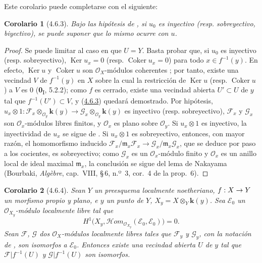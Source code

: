 \documentclass[10pt,oneside,openany]{book}
\theoremstyle{egaenv}\newtheorem*{env}{---}
\theoremstyle{egastatement}
\newtheorem*{corollary}{Corolario}
\theoremstyle{egadescription}
\newcommand{\oldpage}[2][]{\marginnote{\normalfont\scriptsize\textbf{#1}\,|\,#2}\ignorespaces}
\renewcommand{\to}{\mathchoice{\longrightarrow}{\rightarrow}{\rightarrow}{\rightarrow}}
\begin{document}
Este corolario puede completarse con el siguiente:

\begin{corollary}[4.6.3]
\label{III.4.6.3}
\label{III.4.6.3-fr}
Bajo las hipótesis de , si $u_0$ es inyectivo \textup{(resp.} sobreyectivo, biyectivo), se puede suponer que lo mismo ocurre con $u$.
\end{corollary}

\begin{proof}
Se puede limitar al caso en que $U=Y$. Basta probar
que, si $u_0$ es
inyectivo (resp. sobreyectivo), $\operatorname{Ker}u_x=0$ (resp.
$\operatorname{Coker}u_x=0$) para todo $x\in f^{-1}(y)$. En efecto, $\operatorname{Ker}u$ y $\operatorname{Coker}u$ son
$\mathcal O_X$-módulos coherentes ; por tanto, existe una
vecindad $V$ de $f^{-1}(y)$ en $X$ sobre la cual la restricción de
$\operatorname{Ker}u$ (resp. $\operatorname{Coker}u$) a $V$ es $0$
(\textbf{0}\textsubscript{I}, 5.2.2); como $f$ es cerrado, existe una vecindad abierta
$U'\subset U$ de $y$ tal que $f^{-1}(U')\subset V$, y
(\hyperref[III.4.6.3-fr]{4.6.3}) quedará demostrado. Por hipótesis,
$u_x\otimes1:
\mathcal F_x\otimes_{\mathcal O_y}\boldsymbol{k}(y)
\longrightarrow
\mathcal G_x\otimes_{\mathcal O_y}\boldsymbol{k}(y)$
es inyectivo (resp. sobreyectivo),
\oldpage[III]{142}
$\mathcal F_x$ y $\mathcal G_x$
son $\mathcal O_x$-módulos libres finitos, y $\mathcal O_x$ es plano sobre
$\mathcal O_y$. Si $u_x\otimes1$ es inyectivo, la inyectividad de $u_x$
se sigue de . Si $u_x\otimes1$ es sobreyectivo,
entonces, con mayor razón, el homomorfismo inducido
$\mathcal F_x/\mathfrak m_x\mathcal F_x
\longrightarrow
\mathcal G_x/\mathfrak m_x\mathcal G_x$, que se deduce por paso a los cocientes, es sobreyectivo; como $\mathcal G_x$ es un $\mathcal O_x$-módulo finito y
$\mathcal O_x$ es un anillo local de ideal maximal $\mathfrak m_x$, la
conclusión se sigue del lema de Nakayama (Bourbaki,
\emph{Alg\`ebre}, cap.~VIII, \S\,6, n.º~3, cor.~4 de la prop.~6).
\end{proof}

\begin{corollary}[4.6.4]
\label{III.4.6.4}
\label{III.4.6.4-fr}
Sean $Y$ un preesquema localmente noetheriano, $f:X\to Y$ un
morfismo propio y plano, e $y$ un punto de $Y$, $X_y=X\otimes_Y\boldsymbol{k}(y)$. Sea $\mathcal E_0$ un
$\mathcal O_{X_y}$-módulo localmente libre tal que
\[
\label{III.4.6.4.1-fr}
H^1\bigl(X_y,
\mathcal{H}\!om_{\mathcal O_{X_y}}(\mathcal E_0,\mathcal E_0)\bigr)=0.
\tag{4.6.4.1}
\]
Sean $\mathcal F$, $\mathcal G$ dos $\mathcal O_X$-módulos localmente libres
tales que $\mathcal F_y$ y $\mathcal G_y$, con la notación de
, son isomorfos a $\mathcal E_0$. Entonces existe una
vecindad abierta $U$ de $y$ tal que $\mathcal F|f^{-1}(U)$ y
$\mathcal G|f^{-1}(U)$ son isomorfos.
\end{corollary}
\end{document}
